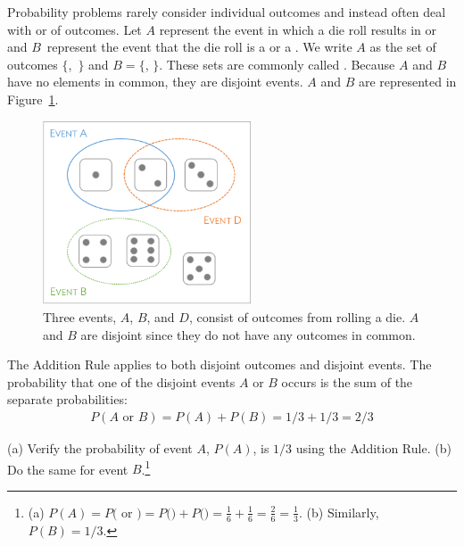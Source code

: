 

Probability problems rarely consider individual outcomes and instead often deal with  or  of outcomes. Let $A$ represent the event in which a die roll results in  or  and $B$~represent the event that the die roll is a  or a . We write $A$ as the set of outcomes $\{$,~$\}$ and $B=\{$, $\}$. These sets are commonly called . Because $A$ and $B$ have no elements in common, they are disjoint events. $A$ and $B$ are represented in Figure~\ref{fig:disjointEvents}.

\begin{figure}[hhh]
\centering
\includegraphics[width=0.55\textwidth]{ch_probability_oi_biostat/figures/disjointEvents/disjointEvents.png}
\caption{Three events, $A$, $B$, and $D$, consist of outcomes from rolling a die. $A$ and $B$ are disjoint since they do not have any outcomes in common.}
\label{fig:disjointEvents}
\end{figure}

The Addition Rule applies to both disjoint outcomes and disjoint events. The probability that one of the disjoint events $A$ or $B$ occurs is the sum of the separate probabilities:
\begin{align*}
P(A\text{ or }B) = P(A) + P(B) = 1/3 + 1/3 = 2/3
\end{align*}

\begin{exercise}
(a) Verify the probability of event $A$, $P(A)$, is $1/3$ using the Addition Rule. (b) Do the same for event $B$.\footnote{(a) $P(A) = P($ or $) = P($$) + P($$) = \frac{1}{6} + \frac{1}{6} = \frac{2}{6} = \frac{1}{3}$. (b) Similarly, $P(B) = 1/3$.}
\end{exercise}

